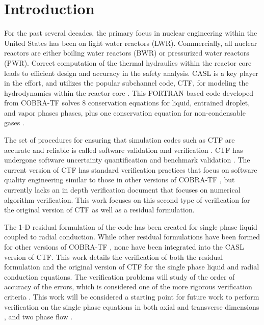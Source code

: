 \vspace*{-80mm}
\chapter{Introduction} \label{chapter1:introduction}

For the past several decades, the primary focus in nuclear engineering within
the United States has been on light water reactors (LWR). Commercially,
all nuclear reactors are either boiling water reactors (BWR) or pressurized
water reactors (PWR). Correct computation of the thermal hydraulics within the
reactor core leads to efficient design and accuracy in the safety analysis. 
CASL is a key player in the effort, and utilizes the popular subchannel code,
CTF, for modeling the hydrodynamics within the reactor core \cite{Schmidt2014}.
This FORTRAN based code developed from COBRA-TF solves 8 conservation equations
for liquid, entrained droplet, and vapor phases phases, plus one conservation
equation for non-condensable gases \cite{CTF_theory}. 

The set of procedures for ensuring that simulation codes such as CTF are
accurate and reliable is called software validation and verification
\cite{Oberkampf2008}. CTF has undergone software uncertainty quantification and
benchmark validation \cite{Avramova2015}. The current version of CTF has
standard verification practices that focus on software quality engineering
similar to those in other versions of COBRA-TF \cite{Aumiller2013}, but
currently lacks an in depth verification document that focuses on numerical
algorithm verification. This work focuses on this second type of verification
for the original version of CTF as well as a residual formulation. 

The 1-D residual formulation of the code has been created for single phase
liquid coupled to radial conduction. While other residual formulations have been
formed for other versions of COBRA-TF \cite{Lloyd2014}, none have been
integrated into the CASL version of CTF. This work details the verification of
both the residual formulation and the original version of CTF for the single
phase liquid and radial conduction equations. The verification problems will
study of the order of accuracy of the errors, which is considered one of the
more rigorous verification criteria \cite{Roy2005}. This work will be
considered a starting point for future work to perform verification on the
single phase equations in both axial and transverse dimensions
\cite{Merroun2009}, and two phase flow \cite{Mahadevan2009}.

